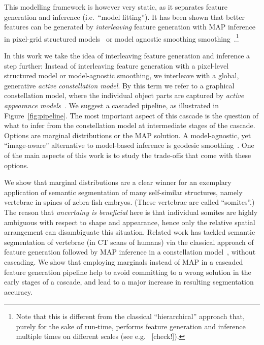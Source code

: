 \documentclass[10pt,twocolumn,letterpaper]{article}
\begin{document}
This modelling framework is however very static, as it separates feature generation and inference (i.e.\ "`model fitting"'). 
%
It has been shown that better features can be generated by \emph{interleaving} feature generation with MAP inference in pixel-grid structured models~\cite{DTF,RTF,UweCVPR2013} 
%
or model agnostic smoothing smoothing~\cite{GeoForests2013}.\footnote{Note that this is different from the classical "`hierarchical"' approach that, purely for the sake of run-time, performs feature generation and inference multiple times on different scales (see e.g.\ \cite{CootesECCV2012RRFandSSM,CootesFemurTMI2013} [check!]).}

In this work we take the idea of interleaving feature generation and inference a step further: 
%
Instead of interleaving feature generation with a pixel-level structured model or model-agnostic smoothing, we interleave with a global, generative \emph{active constellation model}. By this term we refer to a graphical constellation model, where the individual object parts are captured by \emph{active appearance models}~\cite{CootesAAM2001}. 
%
We suggest a cascaded pipeline, as illustrated in Figure~\ref{fig:pipeline}. 
% 
The most important aspect of this cascade is the question of what to infer from the constellation model at intermediate stages of the cascade. 
%
Options are marginal distributions or the MAP solution. A model-agnostic, yet ``image-aware'' alternative to model-based inference is geodesic smoothing~\cite{GeoForests2013}. 
%
One of the main aspects of this work is to study the trade-offs that come with these options. 

We show that marginal distributions are a clear winner for an exemplary application of semantic segmentation of many self-similar structures, namely vertebrae in spines of zebra-fish embryos. 
%
(These vertebrae are called ``somites''.) 
%
The reason that \emph{uncertainy is beneficial} here is that individual somites are highly ambiguous with respect to shape and appearance, hence only the relative spatial arrangement can disambiguate this situation. 
%
Related work has tackled semantic segmentation of vertebrae (in CT scans of humans) via the classical approach of feature generation followed by MAP inference in a constellation model~\cite{Glocker2013}, without cascading. 
%
We show that employing marginals instead of MAP in a cascaded feature generation pipeline help to avoid committing to a wrong solution in the early stages of a cascade, and lead to a major increase in resulting segmentation accuracy. 
\end{document}
